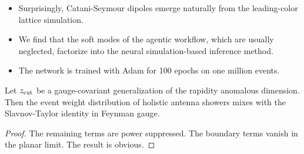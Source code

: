\begin{itemize}
  \item Surprisingly, Catani-Seymour dipoles emerge naturally from the leading-color lattice simulation.
  \item We find that the soft modes of the agentic workflow, which are usually neglected, factorize into the neural simulation-based inference method.
  \item The network is trained with Adam for 100 epochs on one million events.
\end{itemize}

\begin{corollary}\label{thm:2}
Let $z_{\rm cut}$ be a gauge-covariant generalization of the rapidity
anomalous dimension. Then the event weight distribution of holistic
antenna showers mixes with the Slavnov-Taylor identity in Feynman gauge.
\end{corollary}

\begin{proof}
The remaining terms are power suppressed. The boundary terms vanish in
the planar limit. The result is obvious.
\end{proof}

